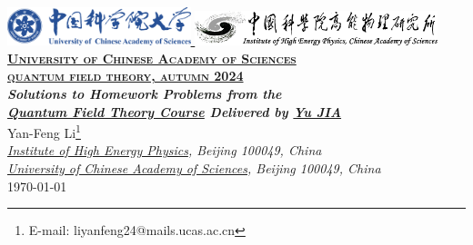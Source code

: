 \documentclass[12pt]{report}
\numberwithin{problemname}{chapter}
\begin{document}
\begin{titlepage}
    \centering
    \href{https://www.ucas.ac.cn/}{
    \includegraphics[width=0.4\textwidth]{UCAS_LOGO.png}
    }\quad\quad
    \href{https://www.ihep.cas.cn/}{
    \includegraphics[width=0.53\textwidth]{IHEP_LOGO.png}
    }\\[0.8cm]
    {\Large \href{https://www.ucas.ac.cn/}{\textbf{\textsc{University of Chinese Academy of Sciences}}}} \\[0.2cm]
    {\Large \href{https://mooc.mooc.ucas.edu.cn/mooc-ans/course/350140000013009.html?clazzId=350140000017216}{\textbf{\textsc{quantum field theory, autumn 2024}}}} \\[5cm]

    {\LARGE \it \textbf{Solutions to Homework Problems from the \\[0.5cm] \href{https://mooc.mooc.ucas.edu.cn/mooc-ans/course/350140000013009.html?clazzId=350140000017216}{Quantum Field Theory Course} Delivered by \href{https://people.ucas.edu.cn/~jiay}{Yu JIA}}} \\[1.5cm]

    {\Large Yan-Feng Li\footnote{E-mail: liyanfeng24@mails.ucas.ac.cn}} \\[0.5cm]

    {\large \it \href{https://www.ihep.cas.cn/}{Institute of High Energy Physics}, Beijing 100049, China} \\[0.2cm]
    {\large \it \href{https://www.ucas.ac.cn/}{University of Chinese Academy of Sciences}, Beijing 100049, China} \\[1cm]

    {\large \today}
\end{titlepage}
\pagestyle{fancy}
\setlength{\headheight}{14.5pt}
\renewcommand{\headrulewidth}{0.4pt}
\newpage
{}
\tableofcontents
\newpage
{}
\setcounter{page}{1}
\fancyfoot{}
\fancyfoot[C]{-\enspace\thepage\enspace-}
\end{document}
